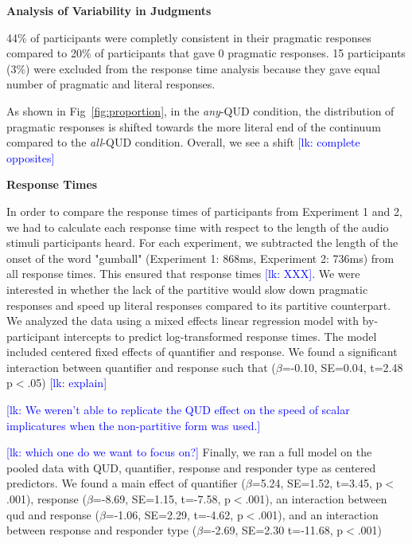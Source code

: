 \documentclass[10pt,letterpaper]{article}
\newcommand{\lk}[1]{\textcolor{Blue}{[lk: #1]}}
\begin{document}
\noindent \textbf{Analysis of Variability in Judgments}

44\% of participants were completly consistent in their pragmatic responses compared to 20\% of participants that gave 0 pragmatic responses. 15 participants (3\%) were excluded from the response time analysis because they gave equal number of pragmatic and literal responses.

As shown in Fig~\ref{fig:proportion}, in the \emph{any}-QUD condition, the distribution of pragmatic responses is shifted towards the more literal end of the continuum compared to the \emph{all}-QUD condition. Overall, we see a shift \lk{complete opposites}

\noindent \textbf{Response Times}

In order to compare the response times of participants from Experiment 1 and 2, we had to calculate each response time with respect to the length of the audio stimuli participants heard. For each experiment, we subtracted the length of the onset of the word "gumball" (Experiment 1: 868ms, Experiment 2: 736ms) from all response times. This ensured that response times \lk{XXX}. We were interested in whether the lack of the partitive would slow down pragmatic responses and speed up literal responses compared to its partitive counterpart. We analyzed the data using a mixed effects linear regression model with by-participant intercepts to predict log-transformed response times. The model included centered fixed effects of quantifier and response. We found a significant interaction between quantifier and response such that ($\beta$=-0.10, SE=0.04, t=2.48 p$<$.05) \lk{explain}

\lk{
We weren't able to replicate the QUD effect on the speed of scalar implicatures when the non-partitive form was used.}

\lk{which one do we want to focus on?}
Finally, we ran a full model on the pooled data with QUD, quantifier, response and responder type as centered predictors. We found a main effect of quantifier ($\beta$=5.24, SE=1.52, t=3.45, p$<$.001), response ($\beta$=-8.69, SE=1.15, t=-7.58, p$<$.001), an interaction between qud and response ($\beta$=-1.06, SE=2.29, t=-4.62, p$<$.001), and an interaction between response and responder type ($\beta$=-2.69, SE=2.30 t=-11.68, p$<$.001)

\end{document}
